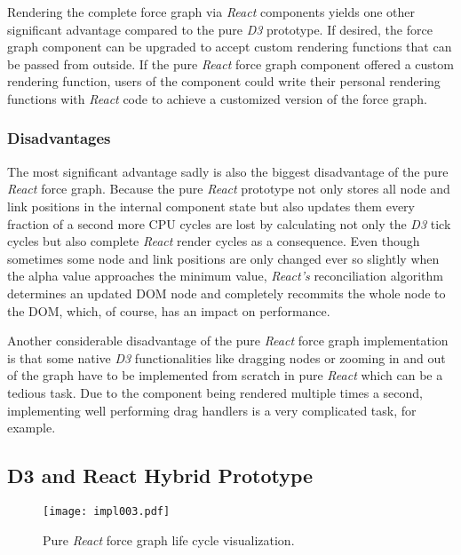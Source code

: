 Rendering the complete force graph via \emph{React} components yields one other sig\-nifi\-cant advantage compared to the pure \emph{D3} prototype. If desired, the force graph component can be upgraded to accept custom rendering functions that can be passed from outside. If the pure \emph{React} force graph component offered a custom rendering function, users of the component could write their personal rendering functions with \emph{React} code to achieve a customized version of the force graph.

\subsubsection{Disadvantages}

The most sig\-nifi\-cant advantage sadly is also the biggest disadvantage of the pure \emph{React} force graph. Because the pure \emph{React} prototype not only stores all node and link positions in the internal component state but also updates them every fraction of a second more CPU cycles are lost by calculating not only the \emph{D3} tick cycles but also complete \emph{React} render cycles as a consequence. Even though sometimes some node and link positions are only changed ever so slightly when the alpha value approaches the minimum value, \emph{React's} reconciliation algorithm determines an updated DOM node and completely recommits the whole node to the DOM, which, of course, has an impact on performance.

Another considerable disadvantage of the pure \emph{React} force graph implementation is that some native \emph{D3} functionalities like dragging nodes or zooming in and out of the graph have to be implemented from scratch in pure \emph{React} which can be a tedious task. Due to the component being rendered multiple times a second, implementing well performing drag handlers is a very complicated task, for example.


\subsection{D3 and React Hybrid Prototype}
\label{sub:D3AndReactHybrid}

\begin{figure}
\centering
\texttt{[image: impl003.pdf]}
\caption{Pure \emph{React} force graph life cycle visualization.}
\label{fig:reactD3HybridLifeCycle}
\end{figure}

